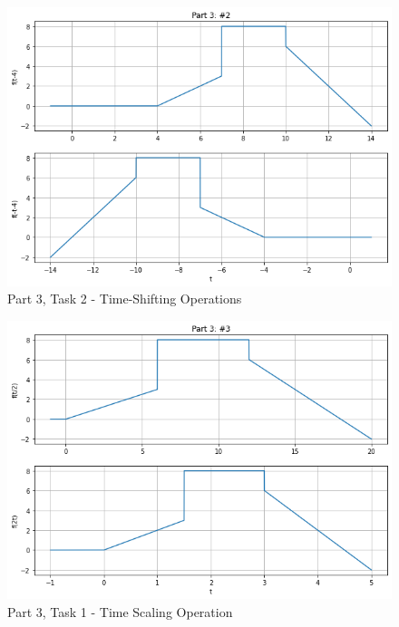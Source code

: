 \documentclass[12pt]{report}
\begin{document}
\begin{figure}[h!]
  \centering
  \includegraphics[scale=0.5]{p3t2.png}
  \caption{Part 3, Task 2 - Time-Shifting Operations}
  \label{fig: p3t2}
\end{figure}
\begin{figure}[h!]
  \centering
  \includegraphics[scale=0.5]{p3t3.png}
  \caption{Part 3, Task 1 - Time Scaling Operation}
  \label{fig: p3t3}
\end{figure}
\end{document}
